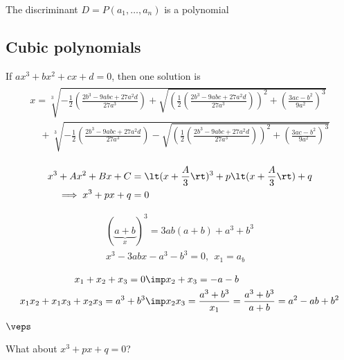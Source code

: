 \documentclass[a4paper]{article}
\begin{document}
\begin{corollary}
  The discriminant \( D=P(a_1,\ldots, a_n) \) is a polynomial
\end{corollary}

\subsection{Cubic polynomials}
If \( ax^3+bx^2+cx+d = 0 \), then one solution is
\begin{align*}
  \begin{array}{l}
  x = \sqrt[3]{-\frac{1}{2} \left(\frac{2b^3 - 9abc + 27a^2d}{27a^3}\right) + \sqrt{\left(\frac{1}{2} \left(\frac{2b^3 - 9abc + 27a^2d}{27a^3}\right)\right)^2 + \left(\frac{3ac - b^2}{9a^2}\right)^3}} \\[10pt]
  \quad + \sqrt[3]{-\frac{1}{2} \left(\frac{2b^3 - 9abc + 27a^2d}{27a^3}\right) - \sqrt{\left(\frac{1}{2} \left(\frac{2b^3 - 9abc + 27a^2d}{27a^3}\right)\right)^2 + \left(\frac{3ac - b^2}{9a^2}\right)^3}}
  \end{array}
\end{align*}

\begin{align*}
  x^3+Ax^2+Bx+C &= \lt(x+\frac{A}{3}\rt)^3+p\lt(x+\frac{A}{3}\rt) + q \\
  \implies x^3+px+q &= 0
\end{align*}

\begin{align*}
  (\underbrace{a+b}_x)^3 = 3ab(a+b) + a^3+b^3 \\
  x^3-3abx-a^3-b^3 = 0,\ \ x_1= a_b
\end{align*}

\begin{align*}
  x_1+x_2+x_3 = 0 &\imp x_2+x_3 = -a-b \\
  x_1x_2+x_1x_3+x_2x_3 = a^3+b^3 &\imp x_2x_3 = \frac{a^3+b^3}{x_1} = \frac{a^3+b^3}{a+b} = a^2-ab+b^2
\end{align*}

\begin{theorem}

\end{theorem}

\begin{example}
  \( \veps \)
\end{example}

\begin{example}
  What about \( x^3+px+q=0 \)?
\end{example}
\end{document}
